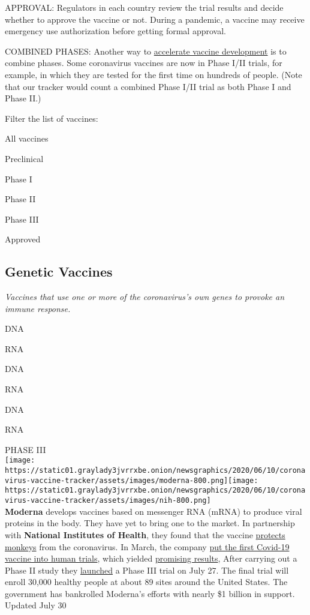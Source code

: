 APPROVAL: Regulators in each country review the trial results and decide
whether to approve the vaccine or not. During a pandemic, a vaccine may
receive emergency use authorization before getting formal approval.

COMBINED PHASES: Another way to
\href{https://www.nytimes3xbfgragh.onion/interactive/2020/04/30/opinion/coronavirus-covid-vaccine.html}{accelerate
vaccine development} is to combine phases. Some coronavirus vaccines are
now in Phase I/II trials, for example, in which they are tested for the
first time on hundreds of people. (Note that our tracker would count a
combined Phase I/II trial as both Phase I and Phase II.)

Filter the list of vaccines:

All vaccines

Preclinical

Phase I

Phase II

Phase III

Approved

\hypertarget{genetic-vaccines}{%
\subsection{\texorpdfstring{\textbf{Genetic
Vaccines}}{Genetic Vaccines}}\label{genetic-vaccines}}

\emph{Vaccines that use one or more of the coronavirus's own genes to
provoke an immune response.}

DNA

RNA

DNA

RNA

DNA

RNA

PHASE III\\
\texttt{[image: https://static01.graylady3jvrrxbe.onion/newsgraphics/2020/06/10/coronavirus-vaccine-tracker/assets/images/moderna-800.png]}\texttt{[image: https://static01.graylady3jvrrxbe.onion/newsgraphics/2020/06/10/coronavirus-vaccine-tracker/assets/images/nih-800.png]}\\
\textbf{Moderna} develops vaccines based on messenger RNA (mRNA) to
produce viral proteins in the body. They have yet to bring one to the
market. In partnership with \textbf{National Institutes of Health}, they
found that the vaccine
\href{https://www.nytimes3xbfgragh.onion/2020/07/28/health/coronavirus-moderna-vaccine-monkeys.html}{protects
monkeys} from the coronavirus. In March, the company
\href{https://www.nytimes3xbfgragh.onion/2020/03/16/health/coronavirus-vaccine.html}{put
the first Covid-19 vaccine into human trials}, which yielded
\href{https://www.nytimes3xbfgragh.onion/2020/07/14/world/coronavirus-update.html\#link-751c8321}{promising
results}, After carrying out a Phase II study they
\href{https://www.nytimes3xbfgragh.onion/2020/07/27/world/coronavirus-covid-19.html\#link-6509720d}{launched}
a Phase III trial on July 27. The final trial will enroll 30,000 healthy
people at about 89 sites around the United States. The government has
bankrolled Moderna's efforts with nearly \$1 billion in support.\\
Updated July 30

